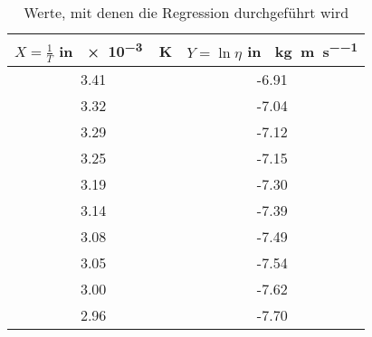 \begin{table}[h!]
\centering
\begin{tabular}{c|c}
	$X=\frac{1}{T}$ in \SI{e-3}{\per\kelvin} & $Y=\ln\eta$ in \si{\ln\kilogram\per\metre\per\second} \\
	\hline
	3.41 & -6.91 \\
	3.32 & -7.04 \\
	3.29 & -7.12 \\
	3.25 & -7.15 \\
	3.19 & -7.30 \\
	3.14 & -7.39 \\
	3.08 & -7.49 \\
	3.05 & -7.54 \\
	3.00 & -7.62 \\
	2.96 & -7.70
\end{tabular}
\caption{Werte, mit denen die Regression durchgeführt wird}
\label{fig:DatenRegression}
\end{table}
